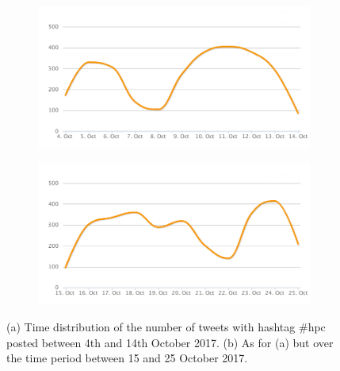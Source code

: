 \begin{figure}
 \centering
 \begin{subfigure}[b]{0.95\textwidth}
   \includegraphics[width=1\linewidth]{Images/FirstSearch_HPC.png}
   \caption{} 
 \end{subfigure}

 \begin{subfigure}[b]{0.95\textwidth}
   \includegraphics[width=1\linewidth]{Images/SecondSearch_HPC.png}
   \caption{}
 \end{subfigure}
 \caption{(a) Time distribution of the number of tweets with hashtag \#hpc posted between 4th and 14th October 2017. (b) As for (a) but over the time period between 15 and 25 October 2017.} 
 \label{First-SecondSearch_HPC}
\end{figure}

